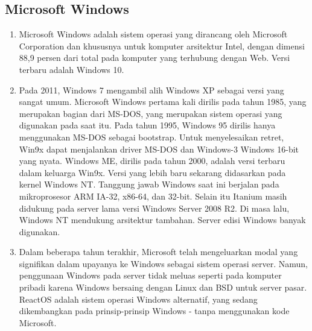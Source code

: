 \subsection{Microsoft Windows}
	\begin{enumerate}
		\item Microsoft Windows adalah sistem operasi yang dirancang oleh Microsoft Corporation dan khususnya untuk komputer arsitektur Intel, dengan dimensi 88,9 persen dari total pada komputer yang terhubung dengan Web. Versi terbaru adalah Windows 10.

		 \item Pada 2011, Windows 7 mengambil alih Windows XP sebagai versi yang sangat umum. Microsoft Windows pertama kali dirilis pada tahun 1985, yang merupakan bagian dari MS-DOS, yang merupakan sistem operasi yang digunakan pada saat itu. Pada tahun 1995, Windows 95 dirilis hanya menggunakan MS-DOS sebagai bootstrap. Untuk menyelesaikan retret, Win9x dapat menjalankan driver MS-DOS dan Windows-3 Windows 16-bit yang nyata. Windows ME, dirilis pada tahun 2000, adalah versi terbaru dalam keluarga Win9x. Versi yang lebih baru sekarang didasarkan pada kernel Windows NT. Tanggung jawab Windows saat ini berjalan pada mikroprosesor ARM IA-32, x86-64, dan 32-bit. Selain itu Itanium masih didukung pada server lama versi Windows Server 2008 R2. Di masa lalu, Windows NT mendukung arsitektur tambahan. Server edisi Windows banyak digunakan. 
		\item Dalam beberapa tahun terakhir, Microsoft telah mengeluarkan modal yang signifikan dalam upayanya ke Windows sebagai sistem operasi server. Namun, penggunaan Windows pada server tidak meluas seperti pada komputer pribadi karena Windows bersaing dengan Linux dan BSD untuk server pasar. ReactOS adalah sistem operasi Windows alternatif, yang sedang dikembangkan pada prinsip-prinsip Windows - tanpa menggunakan kode Microsoft.
	\end{enumerate}
	
	
\cite{silberschatz2014operating}
\cite{hoare1974monitors}
\cite{bach1986design}
\cite{love2005linux}
\cite{kukreja2006rui}
\cite{mckeown2009software}
\cite{russinovich2005microsoft}
\cite{van1994treecon}
\cite{mckusick1985performance}
\cite{higgins1988clustal}
